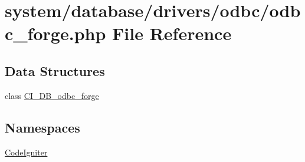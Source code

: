 \hypertarget{odbc__forge_8php}{\section{system/database/drivers/odbc/odbc\-\_\-forge.php File Reference}
\label{odbc__forge_8php}
}
\subsection*{Data Structures}
\begin{DoxyCompactItemize}
\item 
class \hyperlink{class_c_i___d_b__odbc__forge}{C\-I\-\_\-\-D\-B\-\_\-odbc\-\_\-forge}
\end{DoxyCompactItemize}
\subsection*{Namespaces}
\begin{DoxyCompactItemize}
\item 
\hyperlink{namespace_code_igniter}{Code\-Igniter}
\end{DoxyCompactItemize}
